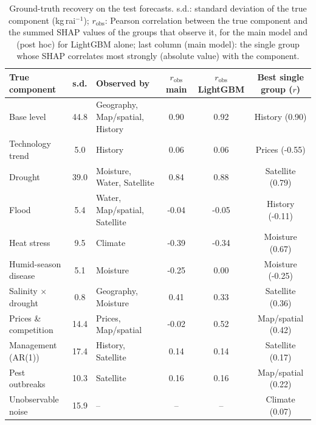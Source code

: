\begin{table}[t]\centering\footnotesize
\caption{Ground-truth recovery on the test forecasts. s.d.: standard deviation of the true component (kg\,rai$^{-1}$); $r_{\mathrm{obs}}$: Pearson correlation between the true component and the summed SHAP values of the groups that observe it, for the main model and (post hoc) for LightGBM alone; last column (main model): the single group whose SHAP correlates most strongly (absolute value) with the component.}\label{tab:recovery}
\begin{tabular}{@{}lcp{3.6cm}ccc@{}}
\toprule
True component & s.d. & Observed by & $r_{\mathrm{obs}}$ main & $r_{\mathrm{obs}}$ LightGBM & Best single group ($r$) \\
\midrule
Base level & 44.8 & Geography, Map/spatial, History & 0.90 & 0.92 & History (0.90) \\
Technology trend & 5.0 & History & 0.06 & 0.06 & Prices (-0.55) \\
Drought & 39.0 & Moisture, Water, Satellite & 0.84 & 0.88 & Satellite (0.79) \\
Flood & 5.4 & Water, Map/spatial, Satellite & -0.04 & -0.05 & History (-0.11) \\
Heat stress & 9.5 & Climate & -0.39 & -0.34 & Moisture (0.67) \\
Humid-season disease & 5.1 & Moisture & -0.25 & 0.00 & Moisture (-0.25) \\
Salinity $\times$ drought & 0.8 & Geography, Moisture & 0.41 & 0.33 & Satellite (0.36) \\
Prices \& competition & 14.4 & Prices, Map/spatial & -0.02 & 0.52 & Map/spatial (0.42) \\
Management (AR(1)) & 17.4 & History, Satellite & 0.14 & 0.14 & Satellite (0.17) \\
Pest outbreaks & 10.3 & Satellite & 0.16 & 0.16 & Map/spatial (0.22) \\
Unobservable noise & 15.9 & -- & -- & -- & Climate (0.07) \\
\bottomrule
\end{tabular}
\end{table}
